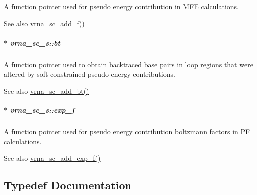 A function pointer used for pseudo energy contribution in M\+F\+E calculations. 

\begin{DoxySeeAlso}{See also}
\hyperlink{group__soft__constraints_ga8c7d907ec0125cd61c04e0908010a4e9}{vrna\+\_\+sc\+\_\+add\+\_\+f()} 
\end{DoxySeeAlso}
\hypertarget{group__soft__constraints_a2a2aca01782c2b980d7b7fd05b9be89c}{}
\subparagraph[{bt}]{$\ast$ vrna\+\_\+sc\+\_\+s\+::bt}\label{group__soft__constraints_a2a2aca01782c2b980d7b7fd05b9be89c}


A function pointer used to obtain backtraced base pairs in loop regions that were altered by soft constrained pseudo energy contributions. 

\begin{DoxySeeAlso}{See also}
\hyperlink{group__soft__constraints_gabde7d07a79bb9a8f4721aee247b674ea}{vrna\+\_\+sc\+\_\+add\+\_\+bt()} 
\end{DoxySeeAlso}
\hypertarget{group__soft__constraints_a0de08a09f3ccf2f97974d23192668ab0}{}
\subparagraph[{exp\+\_\+f}]{$\ast$ vrna\+\_\+sc\+\_\+s\+::exp\+\_\+f}\label{group__soft__constraints_a0de08a09f3ccf2f97974d23192668ab0}


A function pointer used for pseudo energy contribution boltzmann factors in P\+F calculations. 

\begin{DoxySeeAlso}{See also}
\hyperlink{group__soft__constraints_ga87e382b5d0c9b7d9ce1b79c0473ff700}{vrna\+\_\+sc\+\_\+add\+\_\+exp\+\_\+f()} 
\end{DoxySeeAlso}


\subsection{Typedef Documentation}
\hypertarget{group__soft__constraints_gaf38062858ac25fd5e240c2c3b0b0b780}{}
